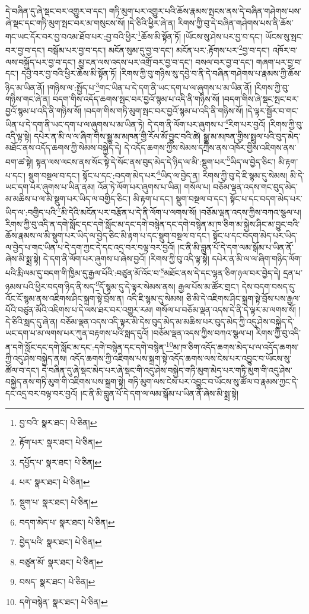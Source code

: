 དེ་བཞིན་དུ་ཞེ་སྡང་བར་འགྱུར་བ་དང་། གཏི་མུག་པར་འགྱུར་པའི་ཆོས་རྣམས་སྤངས་ནས་དེ་བཞིན་གཤེགས་པས་ཞེ་སྡང་དང་གཏི་མུག་སྤང་བར་མ་གསུངས་སོ། །དེ་ཅིའི་ཕྱིར་ཞེ་ན། རིགས་ཀྱི་བུ་དེ་བཞིན་གཤེགས་པས་ནི་ཆོས་གང་ཡང་དོར་བར་བྱ་བའམ་ཐོབ་པར་:བྱ་བའི་ཕྱིར་\footnote{བྱ་བའི་  སྣར་ཐང་།  པེ་ཅིན། }ཆོས་མི་སྟོན་ཏོ། །ཡོངས་སུ་ཤེས་པར་བྱ་བ་དང་། ཡོངས་སུ་སྤང་བར་བྱ་བ་དང་། བསྒོམ་པར་བྱ་བ་དང་། མངོན་སུམ་དུ་བྱ་བ་དང་། མངོན་པར་:རྟོགས་པར་\footnote{རྟོག་པར་  སྣར་ཐང་།  པེ་ཅིན། }བྱ་བ་དང་། འཁོར་བ་ལས་བསྐྱོད་པར་བྱ་བ་དང་། མྱ་ངན་ལས་འདས་པར་འགྲོ་བར་བྱ་བ་དང་། བསལ་བར་བྱ་བ་དང་། གཞག་པར་བྱ་བ་དང་། དབྱེ་བར་བྱ་བའི་ཕྱིར་ཆོས་མི་སྟོན་ཏོ། །རིགས་ཀྱི་བུ་གཉིས་སུ་དབྱེ་བ་ནི་དེ་བཞིན་གཤེགས་པ་རྣམས་ཀྱི་ཆོས་ཉིད་མ་ཡིན་ནོ། །གཉིས་ལ་:སྤྱོད་པ་\footnote{དཔྱོད་པ་  སྣར་ཐང་།  པེ་ཅིན། }གང་ཡིན་པ་དེ་དག་ནི་ཡང་དག་པ་ལ་ཞུགས་པ་མ་ཡིན་ནོ། །རིགས་ཀྱི་བུ་གཉིས་གང་ཞེ་ན། བདག་གིས་འདོད་ཆགས་སྤང་བར་བྱའོ་སྙམ་པ་འདི་ནི་གཉིས་སོ། །བདག་གིས་ཞེ་སྡང་སྤང་བར་བྱའོ་སྙམ་པ་འདི་ནི་གཉིས་སོ། །བདག་གིས་གཏི་མུག་སྤང་བར་བྱའོ་སྙམ་པ་འདི་ནི་གཉིས་སོ། །དེ་ལྟར་སྦྱོར་བ་གང་ཡིན་པ་དེ་དག་ནི་ཡང་དག་པ་ལ་ཞུགས་པ་མ་ཡིན་ཏེ། དེ་དག་ནི་ལོག་པར་ཞུགས་པ་\footnote{པར་  སྣར་ཐང་།  པེ་ཅིན། }རིག་པར་བྱའོ། །རིགས་ཀྱི་བུ་འདི་ལྟ་སྟེ། དཔེར་ན་མི་ལ་ལ་ཞིག་གིས་སྒྱུ་མ་མཁན་གྱི་རོལ་མོ་བྱུང་བའི་ཚེ། སྒྱུ་མ་མཁན་གྱིས་སྤྲུལ་པའི་བུད་མེད་མཐོང་ནས་འདོད་ཆགས་ཀྱི་སེམས་བསྐྱེད་དེ། དེ་འདོད་ཆགས་ཀྱིས་སེམས་དཀྲིས་ནས་འཁོར་གྱིས་འཇིགས་ནས་བག་ཚ་སྟེ། སྟན་ལས་ལངས་ནས་སོང་སྟེ་དེ་སོང་ནས་བུད་མེད་དེ་ཉིད་ལ་མི་:སྡུག་པར་\footnote{སྡུག་པ་  སྣར་ཐང་།  པེ་ཅིན། }ཡིད་ལ་བྱེད་ཅིང་། མི་རྟག་པ་དང་། སྡུག་བསྔལ་བ་དང་། སྟོང་པ་དང་:བདག་མེད་པར་\footnote{བདག་མེད་པ་  སྣར་ཐང་།  པེ་ཅིན། }ཡིད་ལ་བྱེད་ན། རིགས་ཀྱི་བུ་དེ་ཇི་སྙམ་དུ་སེམས། མི་དེ་ཡང་དག་པར་ཞུགས་པ་ཡིན་ནམ། འོན་ཏེ་ལོག་པར་ཞུགས་པ་ཡིན། གསོལ་པ། བཅོམ་ལྡན་འདས་གང་བུད་མེད་མ་མཆིས་པ་ལ་མི་སྡུག་པར་ཡིད་ལ་བགྱིད་ཅིང་། མི་རྟག་པ་དང་། སྡུག་བསྔལ་བ་དང་། སྟོང་པ་དང་བདག་མེད་པར་ཡིད་ལ་:བགྱིད་པའི་\footnote{བྱེད་པའི་  སྣར་ཐང་།  པེ་ཅིན། }མི་དེའི་མངོན་པར་བརྩོན་པ་དེ་ནི་ལོག་པ་ལགས་སོ། །བཅོམ་ལྡན་འདས་ཀྱིས་བཀའ་སྩལ་པ། རིགས་ཀྱི་བུ་འདི་ན་དགེ་སློང་དང་དགེ་སློང་མ་དང་དགེ་བསྙེན་དང་དགེ་བསྙེན་མ་ཁ་ཅིག་མ་སྐྱེས་ཤིང་མ་བྱུང་བའི་ཆོས་རྣམས་ལ་མི་སྡུག་པར་ཡིད་ལ་བྱེད་ཅིང་མི་རྟག་པ་དང་སྡུག་བསྔལ་བ་དང་། སྟོང་པ་དང་བདག་མེད་པར་ཡིད་ལ་བྱེད་པ་གང་ཡིན་པ་དེ་དག་ཀྱང་དེ་དང་འདྲ་བར་བལྟ་བར་བྱའོ། །ང་ནི་མི་བླུན་པོ་དེ་དག་ལམ་སྒོམ་པ་ཡིན་ནོ་ཞེས་མི་སྨྲ་སྟེ། དེ་དག་ནི་ལོག་པར་ཞུགས་པ་ཞེས་བྱའོ། །རིགས་ཀྱི་བུ་འདི་ལྟ་སྟེ། དཔེར་ན་མི་ལ་ལ་ཞིག་གཉིད་ལོག་པའི་རྨི་ལམ་དུ་བདག་གི་ཁྱིམ་དུ་རྒྱལ་པོའི་:བཙུན་མོ་འོང་བ་\footnote{བཙུན་མོ་  སྣར་ཐང་།  པེ་ཅིན། }མཐོང་ནས་དེ་དང་ལྷན་ཅིག་ཉལ་བར་བྱེད་དེ། དྲན་པ་ཉམས་པའི་ཕྱིར་བདག་ཉིད་ནི་སད་\footnote{བསད་  སྣར་ཐང་།  པེ་ཅིན། }དོ་སྙམ་དུ་དེ་ལྟར་སེམས་ནས། རྒྱལ་པོས་མ་ཚོར་གྲང་། དེས་བདག་བསད་དུ་འོང་ངོ་སྙམ་ནས་འཇིགས་ཤིང་སྐྲག་སྟེ་བྲོས་ན། འདི་ཇི་སྙམ་དུ་སེམས། ཅི་མི་དེ་འཇིགས་ཤིང་སྐྲག་སྟེ་བྲོས་པས་རྒྱལ་པོའི་བཙུན་མོའི་འཇིགས་པ་དེ་ལས་ཐར་བར་འགྱུར་རམ། གསོལ་པ་བཅོམ་ལྡན་འདས་དེ་ནི་དེ་ལྟར་མ་ལགས་སོ། །དེ་ཅིའི་སླད་དུ་ཞེ་ན། བཅོམ་ལྡན་འདས་འདི་ལྟར་མི་དེས་བུད་མེད་མ་མཆིས་པར་བུད་མེད་ཀྱི་འདུ་ཤེས་བསྐྱེད་དེ་ཡང་དག་པ་མ་ལགས་པར་ཀུན་བརྟགས་པའི་སླད་དུའོ། །བཅོམ་ལྡན་འདས་ཀྱིས་བཀའ་སྩལ་པ། རིགས་ཀྱི་བུ་འདི་ན་དགེ་སློང་དང་དགེ་སློང་མ་དང་:དགེ་བསྙེན་དང་དགེ་བསྙེན་\footnote{དགེ་བསྙེན་  སྣར་ཐང་།  པེ་ཅིན། }མ་ཁ་ཅིག་འདོད་ཆགས་མེད་པ་ལ་འདོད་ཆགས་ཀྱི་འདུ་ཤེས་བསྐྱེད་ནས། འདོད་ཆགས་ཀྱི་འཇིགས་པས་སྐྲག་སྟེ་འདོད་ཆགས་ལས་ངེས་པར་འབྱུང་བ་ཡོངས་སུ་ཚོལ་བ་དང་། དེ་བཞིན་དུ་ཞེ་སྡང་མེད་པར་ཞེ་སྡང་གི་འདུ་ཤེས་བསྐྱེད་གཏི་མུག་མེད་པར་གཏི་མུག་གི་འདུ་ཤེས་བསྐྱེད་ནས་གཏི་མུག་གི་འཇིགས་པས་སྐྲག་སྟེ། གཏི་མུག་ལས་ངེས་པར་འབྱུང་བ་ཡོངས་སུ་ཚོལ་བ་རྣམས་ཀྱང་དེ་དང་འདྲ་བར་བལྟ་བར་བྱའོ། །ང་ནི་མི་བླུན་པོ་དེ་དག་ལ་ལམ་སྒོམ་པ་ཡིན་ནོ་ཞེས་མི་སྨྲ་སྟེ། 